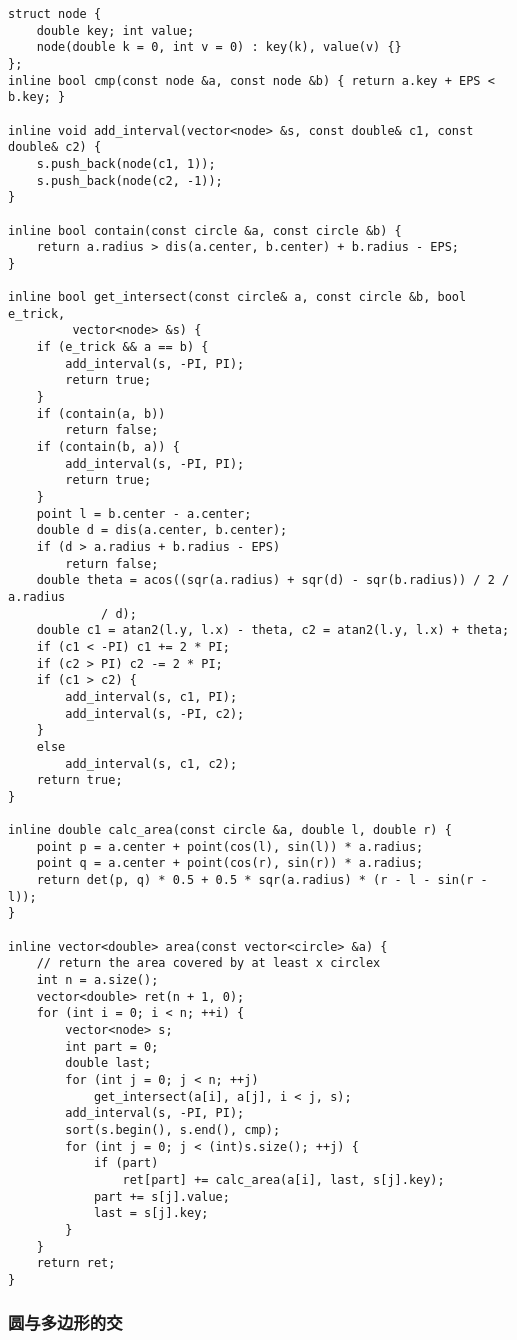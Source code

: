 \documentclass{article}
\begin{document}
\begin{lstlisting}
struct node {
    double key; int value;
    node(double k = 0, int v = 0) : key(k), value(v) {}
};
inline bool cmp(const node &a, const node &b) { return a.key + EPS < b.key; }

inline void add_interval(vector<node> &s, const double& c1, const double& c2) {
    s.push_back(node(c1, 1));
    s.push_back(node(c2, -1));
}

inline bool contain(const circle &a, const circle &b) {
    return a.radius > dis(a.center, b.center) + b.radius - EPS;
}

inline bool get_intersect(const circle& a, const circle &b, bool e_trick,
         vector<node> &s) {
    if (e_trick && a == b) {
        add_interval(s, -PI, PI);
        return true;
    }
    if (contain(a, b))
        return false;
    if (contain(b, a)) {
        add_interval(s, -PI, PI);
        return true;
    }
    point l = b.center - a.center;
    double d = dis(a.center, b.center);
    if (d > a.radius + b.radius - EPS)
        return false;
    double theta = acos((sqr(a.radius) + sqr(d) - sqr(b.radius)) / 2 / a.radius
             / d);
    double c1 = atan2(l.y, l.x) - theta, c2 = atan2(l.y, l.x) + theta;
    if (c1 < -PI) c1 += 2 * PI;
    if (c2 > PI) c2 -= 2 * PI;
    if (c1 > c2) {
        add_interval(s, c1, PI);
        add_interval(s, -PI, c2);
    }
    else
        add_interval(s, c1, c2);
    return true;
}

inline double calc_area(const circle &a, double l, double r) {
    point p = a.center + point(cos(l), sin(l)) * a.radius;
    point q = a.center + point(cos(r), sin(r)) * a.radius;
    return det(p, q) * 0.5 + 0.5 * sqr(a.radius) * (r - l - sin(r - l));
}

inline vector<double> area(const vector<circle> &a) {
    // return the area covered by at least x circlex
    int n = a.size();
    vector<double> ret(n + 1, 0);
    for (int i = 0; i < n; ++i) {
        vector<node> s;
        int part = 0;
        double last;
        for (int j = 0; j < n; ++j)
            get_intersect(a[i], a[j], i < j, s);
        add_interval(s, -PI, PI);
        sort(s.begin(), s.end(), cmp);
        for (int j = 0; j < (int)s.size(); ++j) {
            if (part)
                ret[part] += calc_area(a[i], last, s[j].key);
            part += s[j].value;
            last = s[j].key;
        }
    }
    return ret;
}
\end{lstlisting}

\subsubsection{圆与多边形的交}
\end{document}
